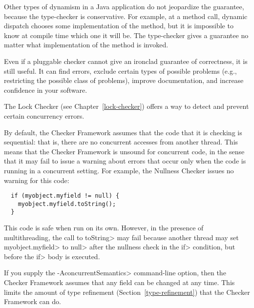 Other types of dynamism in a Java application do not jeopardize the
guarantee, because the type-checker is conservative.  For example, at a
method call, dynamic dispatch chooses some implementation of the method,
but it is impossible to know at compile time which one it will be.  The
type-checker gives a guarantee no matter what implementation of the method
is invoked.


Even if a pluggable checker cannot give an ironclad
guarantee of correctness, it is still useful.  It can find errors,
exclude certain types of possible problems (e.g., restricting the
possible class of problems), improve documentation, and increase confidence
in your software.



The Lock Checker (see Chapter~\ref{lock-checker}) offers a way to detect
and prevent certain concurrency errors.


By default, the Checker Framework assumes that the code that it is checking
is sequential:  that is, there are no concurrent accesses from another
thread.  This means that the Checker Framework is unsound for concurrent
code, in the sense that it may fail to issue a warning about errors that
occur only when the code is running in a concurrent setting.
For example, the Nullness Checker issues no warning for this
code:

\begin{Verbatim}
  if (myobject.myfield != null) {
    myobject.myfield.toString();
  }
\end{Verbatim}

\noindent
This code is safe when run on its own.
However, in the presence of multithreading, the call to \<toString> may
fail because another thread may set \<myobject.myfield> to \<null> after
the nullness check in the \<if> condition, but before the \<if> body is
executed.

If you supply the \<-AconcurrentSemantics> command-line option, then the
Checker Framework assumes that any field can be changed at any time.  This
limits the amount of type refinement
(Section~\ref{type-refinement}) that the Checker Framework can do.



